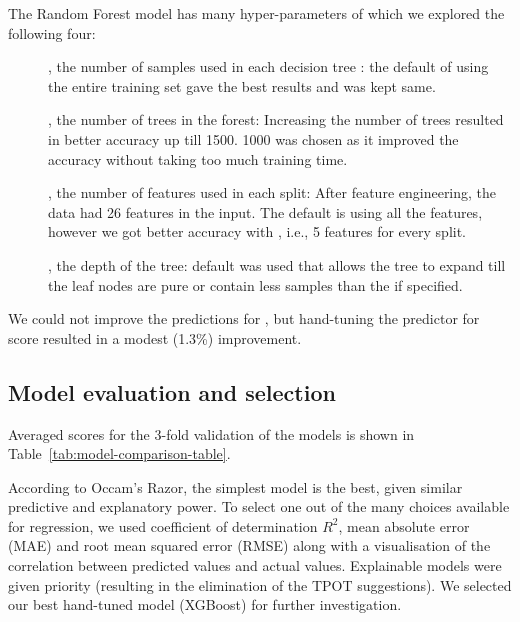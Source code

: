 The Random Forest model has many hyper-parameters of which we explored the following four:
\begin{description}
    \item[], the number of samples used in each decision tree : the default of using the entire training set gave the best results and was kept same.
    \item[], the number of trees in the forest: Increasing the number of trees resulted in better accuracy up till 1500. 1000 was chosen as it improved the accuracy without taking too much training time.
    \item[], the number of features used in each split: After feature engineering, the data had 26 features in the input. The default is using all the features, however we got better accuracy with , i.e., 5 features for every split.
    \item[], the depth of the tree: default was used that allows the tree to expand till the leaf nodes are pure or contain less samples than the  if specified.
\end{description}

We could not improve the predictions for , but hand-tuning the predictor for  score resulted in a modest (1.3\%) improvement.


\subsection{Model evaluation and selection}

Averaged scores for the 3-fold validation of the models is shown in Table\ \ref{tab:model-comparison-table}.

According to Occam’s Razor, the simplest model is the best, given similar predictive and explanatory power. To select one out of the many choices available for regression, we used coefficient of determination $R^2$, mean absolute error (MAE) and root mean squared error (RMSE) along with a visualisation of the correlation between predicted values and actual values. Explainable models were given priority (resulting in the elimination of the TPOT suggestions). 
We selected our best hand-tuned model (XGBoost) for further investigation.

